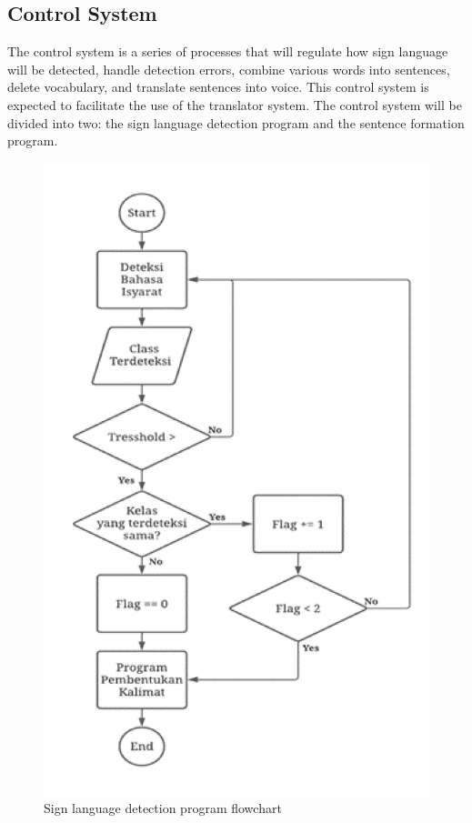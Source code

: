 \subsection{Control System}
\label{subsec:controlsystem}

The control system is a series of processes that will regulate how sign language will be detected, handle detection errors, combine various words into sentences, delete vocabulary, and translate sentences into voice. This control system is expected to facilitate the use of the translator system. The control system will be divided into two: the sign language detection program and the sentence formation program.

\newpage

\begin{figure}[H]
  \centering
  \includegraphics[scale=0.37]{gambar/bab3-flowchart-deteksi.png}
  \caption{Sign language detection program flowchart}
  \label{fig:flowchartdeteksi}
\end{figure}

